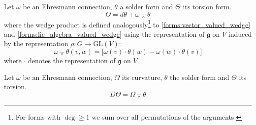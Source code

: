 	
	\begin{formula}
		Let $\omega$ be an Ehresmann connection, $\theta$ a solder form and $\Theta$ its torsion form.
		\begin{equation}
			\Theta = d\theta + \omega\barwedge\theta
		\end{equation}
		where the wedge product is defined analogously\footnote{For forms with $\deg\geq1$ we sum over all permutations of the arguments.} to \ref{forms:vector_valued_wedge} and \ref{forms:lie_algebra_valued_wedge} using the representation of $\mathfrak{g}$ on $V$ induced by the representation $\rho:G\rightarrow\text{GL}(V)$:
		\begin{equation}
			\omega\barwedge\theta(v, w) = \Big[\omega(v)\cdot\theta(w) - \omega(w)\cdot\theta(v)\Big]
		\end{equation}
		where $\cdot$ denotes the representation of $\mathfrak{g}$ on $V$.
	\end{formula}
	
	\begin{property}
		Let $\omega$ be an Ehresmann connection, $\Omega$ its curvature, $\theta$ the solder form and $\Theta$ its torsion.
		\begin{equation}
			\boxed{D\Theta = \Omega\barwedge\theta}
		\end{equation}
	\end{property}
